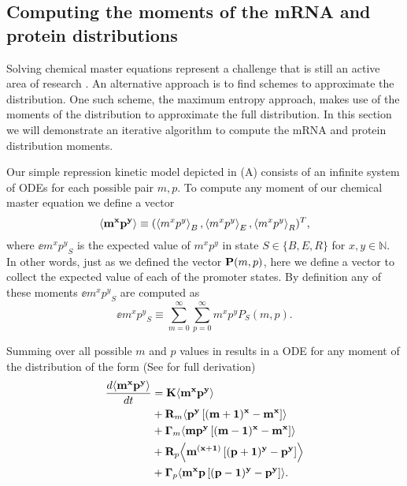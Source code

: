 \subsection{Computing the moments of the mRNA and protein distributions}
\label{sec_moments}

Solving chemical master equations represent a challenge that is still an active
area of research \cite{Dinh2016}. An alternative approach is to find schemes to
approximate the distribution. One such scheme, the maximum entropy approach,
makes use of the moments of the distribution to approximate the full
distribution. In this section we will demonstrate an iterative algorithm to
compute the mRNA and protein distribution moments.

Our simple repression kinetic model depicted in (A)
consists of an infinite system of ODEs for each possible pair $m, p$. To
compute any moment of our chemical master equation we define a vector
\begin{equation}
	\left\langle \mathbf{m^x p^y} \right\rangle \equiv (\left\langle m^x p^y \right\rangle_B, \left\langle m^x p^y \right\rangle_E, \left\langle m^x p^y \right\rangle_R)^T,
\end{equation}
where $\ee{m^x p^y}_S$ is the expected value of $m^x p^y$ in state $S \in \{B,
E, R\}$ for $x, y \in \mathbb{N}$. In other words, just as we defined the vector
$\mathbf{P}(m, p)$, here we define a vector to collect the expected value of each of
the promoter states. By definition any of these moments $\ee{m^x p^y}_S$ are
computed as
\begin{equation}
  \ee{m^x p^y}_S \equiv \sum_{m=0}^\infty \sum_{p=0}^\infty m^x p^y P_S(m, p).
  \label{eq_mom_def}
\end{equation}

Summing over all possible $m$ and $p$ values in  results in
a ODE for any moment of the distribution of the form (See 
for full derivation)
\begin{equation}
  \begin{aligned}
    {d{\mathbf{\left\langle m^x p^y \right\rangle}} \over dt} &=
    \mathbf{K} \mathbf{\left\langle m^x p^y \right\rangle}\\
    &+ \mathbf{R}_m \mathbf{\left\langle p^y \left[ (m + 1)^x -m^x \right] \right\rangle}\\
    &+ \mathbf{\Gamma}_m \mathbf{\left\langle m p^y \left[ (m - 1)^x - m^x \right] \right\rangle}\\
    &+ \mathbf{R}_p \mathbf{\left\langle m^{(x + 1)} \left[ (p + 1)^y - p^y \right] \right\rangle}\\
    &+ \mathbf{\Gamma}_p \mathbf{\left\langle m^x p \left[ (p - 1)^y - p^y \right] \right\rangle}.
    \label{eq_gral_mom}
  \end{aligned}
\end{equation}

